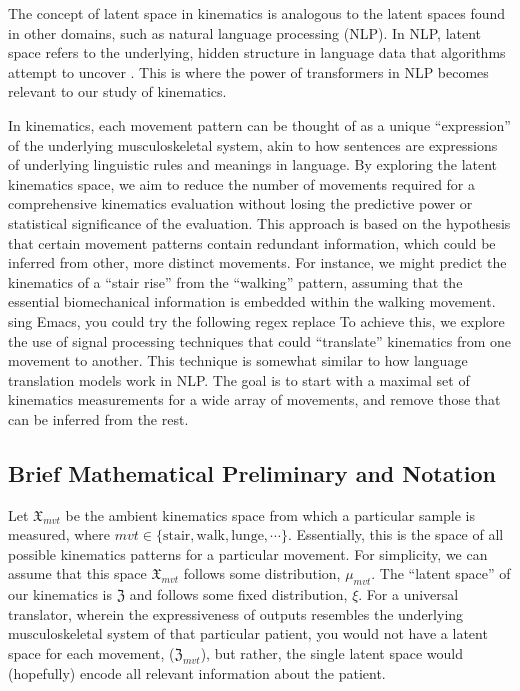 The concept of latent space in kinematics is analogous to the latent spaces found in other domains, such as natural language processing (NLP).
In NLP, latent space refers to the underlying, hidden structure in language data that algorithms attempt to uncover \cite{jurafskySpeechLanguageProcessing2009}.
This is where the power of transformers \cite{vaswaniAttentionAllYou2017} in NLP becomes relevant to our study of kinematics.

In kinematics, each movement pattern can be thought of as a unique ``expression'' of the underlying musculoskeletal system, akin to how sentences are expressions of underlying linguistic rules and meanings in language.
By exploring the latent kinematics space, we aim to reduce the number of movements required for a comprehensive kinematics evaluation without losing the predictive power or statistical significance of the evaluation.
This approach is based on the hypothesis that certain movement patterns contain redundant information, which could be inferred from other, more distinct movements.
For instance, we might predict the kinematics of a ``stair rise'' from the ``walking'' pattern, assuming that the essential biomechanical information is embedded within the walking movement.
sing Emacs, you could try the following regex replace
To achieve this, we explore the use of signal processing techniques that could ``translate'' kinematics from one movement to another.
This technique is somewhat similar to how language translation models work in NLP.
The goal is to start with a maximal set of kinematics measurements for a wide array of movements, and remove those that can be inferred from the rest.

\subsection{Brief Mathematical Preliminary and Notation}
Let $\mathfrak{X}_{mvt}$ be the ambient kinematics space from which a particular sample is measured, where $mvt \in \{\text{stair},\text{walk}, \text{lunge}, \cdots\}$.
Essentially, this is the space of all possible kinematics patterns for a particular movement.
For simplicity, we can assume that this space $\mathfrak{X}_{mvt}$ follows some distribution, $\mu_{mvt}$.
The ``latent space'' of our kinematics is $\mathfrak{Z}$ and follows some fixed distribution, $\xi$.
For a universal translator, wherein the expressiveness of outputs resembles the underlying musculoskeletal system of that particular patient, you would not have a latent space for each movement, ($\mathfrak{Z}_{mvt}$), but rather, the single latent space would (hopefully) encode all relevant information about the patient.

